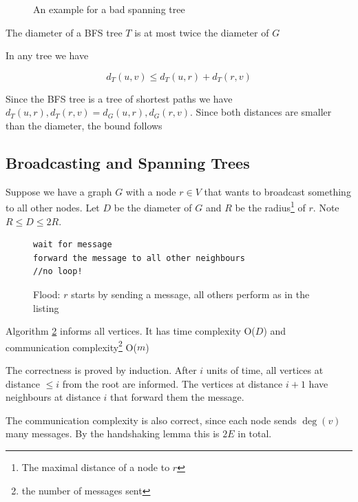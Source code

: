 \begin{figure}
\begin{center}
\end{center}
\caption{An example for a bad spanning tree}
\label{fig:diameter_ratio_spanning_tree}
\end{figure}

\begin{lem} The diameter of a BFS tree $T$ is at most twice the diameter of $G$\end{lem}
\begin{pr} In any tree we have

\[d_T(u,v) \leq d_T(u,r) + d_T(r,v)\]

Since the BFS tree is a tree of shortest paths we have $d_T(u,r), d_T(r,v) = d_G(u,r), d_G(r,v)$. Since both distances are smaller than the diameter, the bound follows\end{pr} 

\subsection{Broadcasting and Spanning Trees}

Suppose we have a graph $G$ with a node $r\in V$ that wants to broadcast something to all other nodes. Let $D$ be the diameter of $G$ and $R$ be the radius\footnote{The maximal distance of a node to $r$} of $r$. Note $R\leq D\leq 2R$.

\begin{figure}
\begin{lstlisting}
wait for message
forward the message to all other neighbours 
//no loop!
\end{lstlisting}
\caption{Flood: $r$ starts by sending a message, all others perform as in the listing}
\label{alg:flood}
\end{figure}

\begin{thm} Algorithm \ref{alg:flood} informs all vertices. It has time complexity O($D$) and communication complexity\footnote{the number of messages sent} O($m$)
\end{thm}

\begin{pr} The correctness is proved by induction. After $i$ units of time, all vertices at distance $\leq i$ from the root are informed. The vertices at distance $i+1$ have neighbours at distance $i$ that forward them the message.

The communication complexity is also correct, since each node sends $\deg(v)$ many messages. By the handshaking lemma this is $2E$ in total.
\end{pr}

